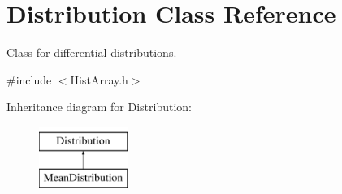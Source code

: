 \hypertarget{classDistribution}{}\section{Distribution Class Reference}
\label{classDistribution}


Class for differential distributions.  




{\ttfamily \#include $<$Hist\+Array.\+h$>$}

Inheritance diagram for Distribution\+:\begin{figure}[H]
\begin{center}
\leavevmode
\includegraphics[height=2.000000cm]{classDistribution}
\end{center}
\end{figure}
